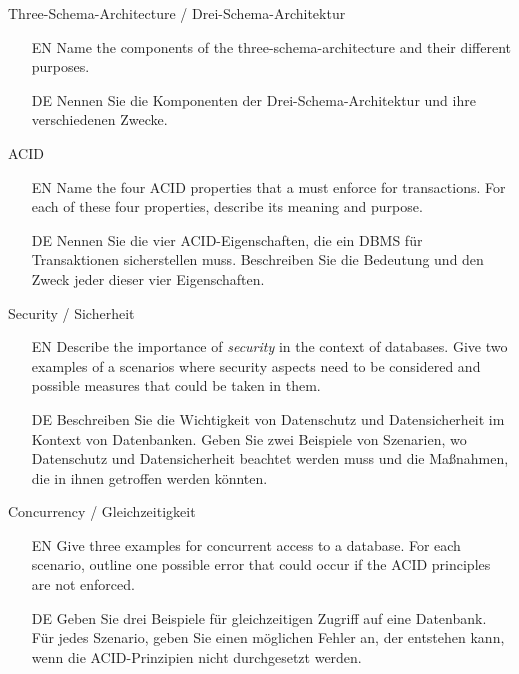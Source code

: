 %
%
%
\begin{question}{Three-Schema-Architecture / Drei-Schema-Architektur}%
\begin{itemize}%
\item[EN] Name the components of the three-schema-architecture and their different purposes.%
\item[DE] Nennen Sie die Komponenten der Drei-Schema-Architektur und ihre verschiedenen Zwecke.%
\end{itemize}%
\end{question}%
%
\begin{question}{ACID}%
\begin{itemize}%
\item[EN] Name the four ACID properties that a  must enforce for transactions. %
For each of these four properties, describe its meaning and purpose.%
\item[DE] Nennen Sie die vier ACID-Eigenschaften, die ein DBMS für Transaktionen sicherstellen muss. %
Beschreiben Sie die Bedeutung und den Zweck jeder dieser vier Eigenschaften.%
\end{itemize}%
\end{question}%
%
\begin{question}{Security / Sicherheit}%
\begin{itemize}%
\item[EN] Describe the importance of \emph{security} in the context of databases. %
Give two examples of a scenarios where security aspects need to be considered and possible measures that could be taken in them.%
\item[DE] Beschreiben Sie die Wichtigkeit von Datenschutz und Datensicherheit im Kontext von Datenbanken. %
Geben Sie zwei Beispiele von Szenarien, wo Datenschutz und Datensicherheit beachtet werden muss und die Maßnahmen, die in ihnen getroffen werden könnten.%
\end{itemize}%
\end{question}%
%
\begin{question}{Concurrency / Gleichzeitigkeit}%
\begin{itemize}%
\item[EN] Give three examples for concurrent access to a database. %
For each scenario, outline one possible error that could occur if the ACID principles are not enforced.%
\item[DE] Geben Sie drei Beispiele für gleichzeitigen Zugriff auf eine Datenbank. %
Für jedes Szenario, geben Sie einen möglichen Fehler an, der entstehen kann, wenn die ACID-Prinzipien nicht durchgesetzt werden.%
\end{itemize}%
\end{question}%
